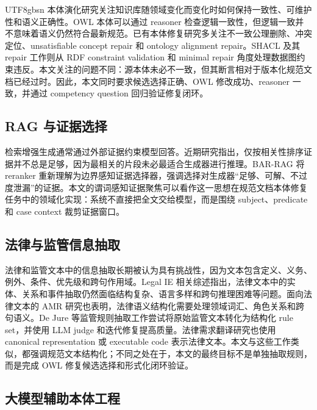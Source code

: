 \documentclass[11pt]{article}
\begin{document}
\begin{CJK*}{UTF8}{gbsn}
本体演化研究关注知识库随领域变化而变化时如何保持一致性、可维护性和语义正确性\cite{flouris2008ontologychange,hartung2013ontologyevolution}。OWL 本体可以通过 reasoner 检查逻辑一致性\cite{w3cowl2}，但逻辑一致并不意味着语义仍然符合最新规范。已有本体修复研究多关注不一致公理删除、冲突定位、unsatisfiable concept repair 和 ontology alignment repair\cite{kalyanpur2006repair,jimenezruiz2015alignmentrepair}。SHACL 及其 repair 工作则从 RDF constraint validation 和 minimal repair 角度处理数据图约束违反\cite{w3cshacl2017,ahmetaj2022shaclrepair,ahmetaj2025shacllogic}。本文关注的问题不同：源本体未必不一致，但其断言相对于版本化规范文档已经过时。因此，本文同时要求候选选择正确、OWL 修改成功、reasoner 一致，并通过 competency question 回归验证修复闭环。

\subsection{RAG 与证据选择}

检索增强生成通常通过外部证据约束模型回答\cite{lewis2020rag}。近期研究指出，仅按相关性排序证据并不总是足够，因为最相关的片段未必最适合生成器进行推理。BAR-RAG 将 reranker 重新理解为边界感知证据选择器，强调选择对生成器“足够、可解、不过度泄漏”的证据\cite{sun2026barrag}。本文的谓词感知证据聚焦可以看作这一思想在规范文档本体修复任务中的领域化实现：系统不直接把全文交给模型，而是围绕 subject、predicate 和 case context 裁剪证据窗口。

\subsection{法律与监管信息抽取}

法律和监管文本中的信息抽取长期被认为具有挑战性，因为文本包含定义、义务、例外、条件、优先级和跨句作用域。Legal IE 相关综述指出，法律文本中的实体、关系和事件抽取仍然面临结构复杂、语言多样和跨句推理困难等问题\cite{premasiri2025legalie}。面向法律文本的 AMR 研究也表明，法律语义结构化需要处理领域词汇、角色关系和跨句语义\cite{vu2022legalamr}。De Jure 等监管规则抽取工作尝试将原始监管文本转化为结构化 rule set，并使用 LLM judge 和迭代修复提高质量\cite{guliani2026dejure}。法律需求翻译研究也使用 canonical representation 或 executable code 表示法律文本\cite{singhal2025legalrequirements}。本文与这些工作类似，都强调规范文本结构化；不同之处在于，本文的最终目标不是单独抽取规则，而是完成 OWL 修复候选选择和形式化闭环验证。

\subsection{大模型辅助本体工程}


\end{CJK*}
\end{document}
